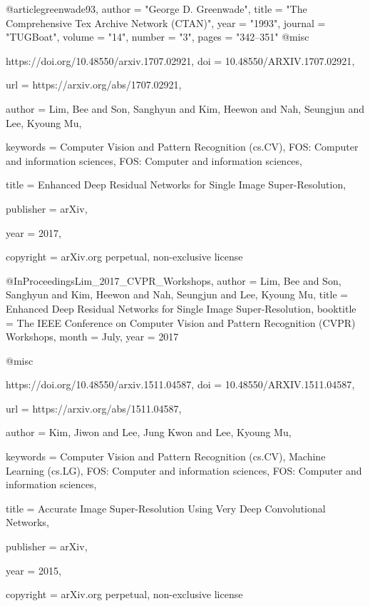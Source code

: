 @article{greenwade93,
    author  = "George D. Greenwade",
    title   = "The {C}omprehensive {T}ex {A}rchive {N}etwork ({CTAN})",
    year    = "1993",
    journal = "TUGBoat",
    volume  = "14",
    number  = "3",
    pages   = "342--351"
}
@misc{https://doi.org/10.48550/arxiv.1707.02921,
  doi = {10.48550/ARXIV.1707.02921},
  
  url = {https://arxiv.org/abs/1707.02921},
  
  author = {Lim, Bee and Son, Sanghyun and Kim, Heewon and Nah, Seungjun and Lee, Kyoung Mu},
  
  keywords = {Computer Vision and Pattern Recognition (cs.CV), FOS: Computer and information sciences, FOS: Computer and information sciences},
  
  title = {Enhanced Deep Residual Networks for Single Image Super-Resolution},
  
  publisher = {arXiv},
  
  year = {2017},
  
  copyright = {arXiv.org perpetual, non-exclusive license}
}

@InProceedings{Lim_2017_CVPR_Workshops,
  author = {Lim, Bee and Son, Sanghyun and Kim, Heewon and Nah, Seungjun and Lee, Kyoung Mu},
  title = {Enhanced Deep Residual Networks for Single Image Super-Resolution},
  booktitle = {The IEEE Conference on Computer Vision and Pattern Recognition (CVPR) Workshops},
  month = {July},
  year = {2017}
}

@misc{https://doi.org/10.48550/arxiv.1511.04587,
  doi = {10.48550/ARXIV.1511.04587},
  
  url = {https://arxiv.org/abs/1511.04587},
  
  author = {Kim, Jiwon and Lee, Jung Kwon and Lee, Kyoung Mu},
  
  keywords = {Computer Vision and Pattern Recognition (cs.CV), Machine Learning (cs.LG), FOS: Computer and information sciences, FOS: Computer and information sciences},
  
  title = {Accurate Image Super-Resolution Using Very Deep Convolutional Networks},
  
  publisher = {arXiv},
  
  year = {2015},
  
  copyright = {arXiv.org perpetual, non-exclusive license}
}


